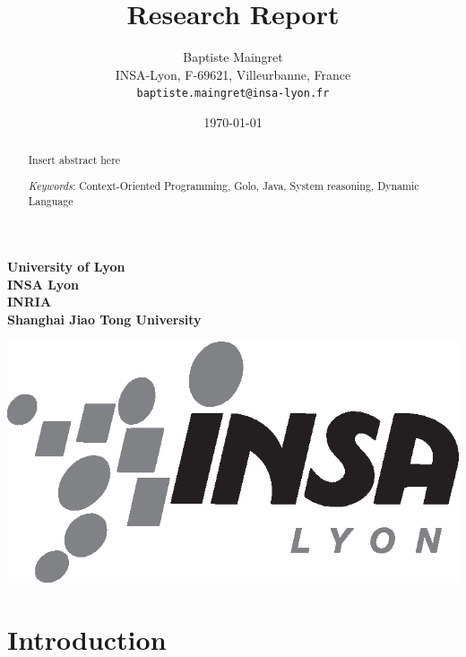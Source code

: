 \documentclass[a4paper]{article}
\begin{document}
\hfill
\begin{minipage}{0.3\columnwidth}
\small
\centering
\textbf{
University of Lyon \\ %
INSA Lyon \\ %
INRIA \\
Shanghai Jiao Tong University
}
\end{minipage}
\hfill
\begin{minipage}[b]{0.25\columnwidth}
\includegraphics[width=\columnwidth]{logo/insa-noir.eps}%
\end{minipage}

\newpage

%
%

\title{Research Report}

\author{Baptiste Maingret\\[10pt]
INSA-Lyon, F-69621, Villeurbanne, France\\
\texttt{baptiste.maingret@insa-lyon.fr}}

\date{\today}
\newcommand{\Keywords}[1]{\par\noindent 
{\small{\em Keywords\/}: #1}}
\maketitle

\begin{abstract} 
Insert abstract here
\Keywords{Context-Oriented Programming, Golo, Java, System reasoning, Dynamic Language}
\end{abstract}

\newpage

%
%

\section{Introduction}
\end{document}
